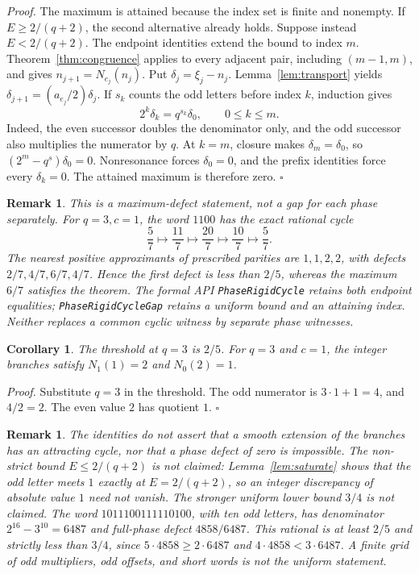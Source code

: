 \documentclass[11pt,letterpaper]{article}
\newtheorem{corollary}[theorem]{Corollary}
\newtheorem{remark}[theorem]{Remark}
\newenvironment{proof}{\noindent\textit{Proof.}}{\hfill\(\square\)}
\begin{document}
\begin{proof}
The maximum is attained because the index set is finite and nonempty.
If \(E\ge2/(q+2)\), the second alternative already holds. Suppose instead
\(E<2/(q+2)\). The endpoint identities extend the bound to index \(m\).
Theorem~\ref{thm:congruence} applies to every adjacent pair, including
\((m-1,m)\), and gives \(n_{j+1}=N_{e_j}(n_j)\).
Put \(\delta_j=\xi_j-n_j\). Lemma~\ref{lem:transport} yields
\(\delta_{j+1}=(a_{e_j}/2)\delta_j\).
If \(s_k\) counts the odd letters before index \(k\), induction gives
\[
2^k\delta_k=q^{s_k}\delta_0,\qquad 0\le k\le m.
\]
Indeed, the even successor doubles the denominator only, and the odd
successor also multiplies the numerator by \(q\). At \(k=m\), closure
makes \(\delta_m=\delta_0\), so
\((2^m-q^s)\delta_0=0\). Nonresonance forces \(\delta_0=0\), and the
prefix identities force every \(\delta_k=0\). The attained maximum is
therefore zero.
\end{proof}

\begin{remark}
This is a maximum-defect statement, not a gap for each phase separately.
For \(q=3,c=1\), the word \(1100\) has the exact rational cycle
\[
\frac57\longmapsto\frac{11}7\longmapsto\frac{20}7
\longmapsto\frac{10}7\longmapsto\frac57.
\]
The nearest positive approximants of prescribed parities are
\(1,1,2,2\), with defects \(2/7,4/7,6/7,4/7\). Hence the first defect is
less than \(2/5\), whereas the maximum \(6/7\) satisfies the theorem.
The formal API \texttt{PhaseRigidCycle} retains both endpoint equalities;
\texttt{PhaseRigidCycleGap} retains a uniform bound and an attaining index.
Neither replaces a common cyclic witness by separate phase witnesses.
\end{remark}

\begin{corollary}
\label{cor:fifth}
The threshold at \(q=3\) is \(2/5\). For \(q=3\) and \(c=1\), the integer branches satisfy \(N_1(1)=2\) and \(N_0(2)=1\).
\end{corollary}

\begin{proof}
Substitute \(q=3\) in the threshold. The odd numerator is \(3\cdot 1+1=4\), and \(4/2=2\). The even value \(2\) has quotient \(1\).
\end{proof}

\begin{remark}
\label{rem:not}
The identities do not assert that a smooth extension of the branches has an attracting cycle, nor that a phase defect of zero is impossible. The non-strict bound \(E\leq 2/(q+2)\) is not claimed: Lemma~\ref{lem:saturate} shows that the odd letter meets \(1\) exactly at \(E=2/(q+2)\), so an integer discrepancy of absolute value \(1\) need not vanish. The stronger uniform lower bound \(3/4\) is not claimed. The word \(1011100111110100\), with ten odd letters, has denominator \(2^{16}-3^{10}=6487\) and full-phase defect \(4858/6487\). This rational is at least \(2/5\) and strictly less than \(3/4\), since \(5\cdot 4858\geq 2\cdot 6487\) and \(4\cdot 4858<3\cdot 6487\). A finite grid of odd multipliers, odd offsets, and short words is not the uniform statement.
\end{remark}
\end{document}
